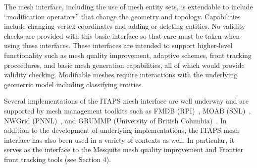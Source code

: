 The mesh interface, including the use of mesh entity sets, is extendable to
include ``modification operators'' that change the geometry and topology.
Capabilities include changing vertex coordinates and adding or deleting
entities. No validity checks are provided with this basic interface so that
care must be taken when using these interfaces.  These interfaces are intended
to support higher-level functionality such as mesh quality improvement,
adaptive schemes, front tracking proceedures, and basic mesh generation
capabilities, all of which would provide validity checking.  Modifiable meshes
require interactions with the underlying geometric model including classifying
entities.  

Several implementations of the ITAPS mesh interface are well underway and are
supported by mesh management toolkits such as FMDB (RPI)~\cite{ReSh03},
MOAB (SNL)~\cite{moab:http}, NWGrid
(PNNL)~\cite{nwgrid:http}, and GRUMMP (University of British
Columbia)~\cite{GRUMMP:http}.  In addition to the development of underlying
implementations, the ITAPS mesh interface has also been used in a variety of
contexts as well.  In particular, it serves as the interface to the Mesquite
mesh quality improvement and Frontier front tracking tools (see Section 4).





